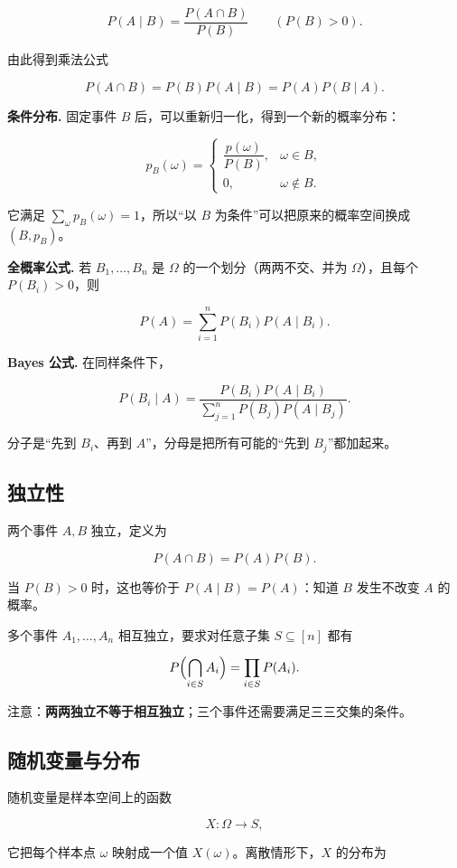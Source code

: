 \[
P(A\mid B)=\frac{P(A\cap B)}{P(B)}\qquad(P(B)>0).
\]

由此得到乘法公式

\[
P(A\cap B)=P(B)P(A\mid B)=P(A)P(B\mid A).
\]

\textbf{条件分布.} 固定事件 $B$ 后，可以重新归一化，得到一个新的概率分布：

\[
p_B(\omega)=
\begin{cases}
\dfrac{p(\omega)}{P(B)}, & \omega\in B,\\[4pt]
0, & \omega\notin B.
\end{cases}
\]

它满足 $\sum_{\omega}p_B(\omega)=1$，所以“以 $B$ 为条件”可以把原来的概率空间换成 $(B,p_B)$。

\textbf{全概率公式.} 若 $B_1,\dots,B_n$ 是 $\Omega$ 的一个划分（两两不交、并为 $\Omega$），且每个 $P(B_i)>0$，则

\[
P(A)=\sum_{i=1}^{n}P(B_i)P(A\mid B_i).
\]

\textbf{Bayes 公式.} 在同样条件下，

\[
P(B_i\mid A)
=
\frac{P(B_i)P(A\mid B_i)}
{\sum_{j=1}^{n}P(B_j)P(A\mid B_j)}.
\]

分子是“先到 $B_i$、再到 $A$”，分母是把所有可能的“先到 $B_j$”都加起来。

\subsection{独立性}


两个事件 $A,B$ 独立，定义为

\[
P(A\cap B)=P(A)P(B).
\]

当 $P(B)>0$ 时，这也等价于 $P(A\mid B)=P(A)$：知道 $B$ 发生不改变 $A$ 的概率。

多个事件 $A_1,\dots,A_n$ 相互独立，要求对任意子集 $S\subseteq[n]$ 都有

\[
P\Bigl(\bigcap_{i\in S}A_i\Bigr)=\prod_{i\in S}P(A_i).
\]

注意：\textbf{两两独立不等于相互独立}；三个事件还需要满足三三交集的条件。

\subsection{随机变量与分布}


随机变量是样本空间上的函数

\[
X:\Omega\to S,
\]

它把每个样本点 $\omega$ 映射成一个值 $X(\omega)$。离散情形下，$X$ 的分布为

